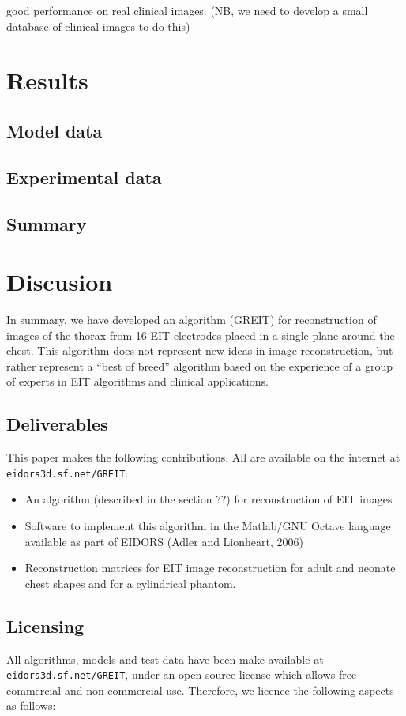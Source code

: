 \documentclass[letterpaper,twocolumn,11pt]{article}
\begin{document}
 good performance on real clinical images.
     (NB, we need to develop a small database of 
          clinical images to do this)

\section{Results}
\subsection{Model data}
\subsection{Experimental data}
\subsection{Summary}
\section{Discusion}

In summary, we have developed an algorithm (GREIT)
for reconstruction of images of the thorax
from 16 EIT electrodes placed in a single plane
around the chest. This algorithm does not represent
new ideas in image reconstruction, but rather represent
a ``best of breed'' algorithm based on the experience
of a group of experts in EIT algorithms and clinical
applications.

\subsection{Deliverables}

This paper makes the following contributions. All are
available on the internet at \verb+eidors3d.sf.net/GREIT+:
\begin{itemize}
\item An algorithm (described in the section ??) for reconstruction
         of EIT images
\item Software to implement this algorithm in the Matlab/GNU Octave
         language available as part of EIDORS (Adler and Lionheart, 2006)
\item Reconstruction matrices for EIT image reconstruction for
      adult and neonate chest shapes and for a cylindrical phantom.
\end{itemize}


\subsection{Licensing}
All algorithms, models and test data have been make
available at \verb+eidors3d.sf.net/GREIT+,
under an open source license which allows
free commercial and non-commercial use. Therefore,
we licence the following aspects as follows:
\end{document}
